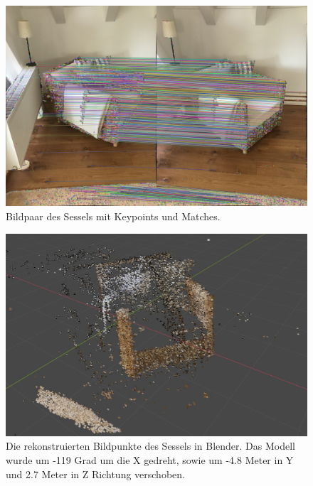 \begin{figure}
    \includegraphics[width=\textwidth]{src/img/chair_first_pair_with_matches.jpg}
    \caption{Bildpaar des Sessels mit Keypoints und Matches.}
    \label{fig:chair-first-pair-with-matches}
\end{figure}

\begin{figure}
    \includegraphics[width=\textwidth]{src/img/chair_model.jpg}
    \caption{Die rekonstruierten Bildpunkte des Sessels in Blender. Das Modell wurde um -119 Grad um die X gedreht, sowie um -4.8 Meter in Y und 2.7 Meter in Z Richtung verschoben.}
    \label{fig:chair-model}
\end{figure}

